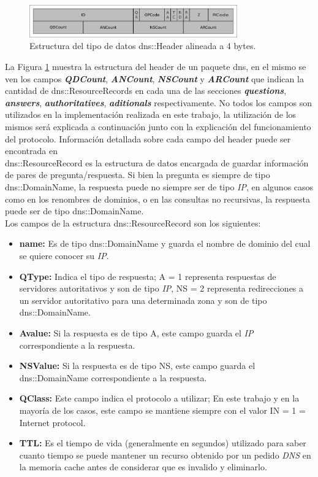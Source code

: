 \documentclass[10pt,a4paper]{article}
\begin{document}
\begin{figure}[!htb]
    \centering
    \includegraphics[width = 0.8\textwidth]{img/png/dns-header.png}
    \caption{Estructura del tipo de datos dns::Header alineada a 4 bytes.}
    \label{figure: dns header}
\end{figure}

La Figura \ref{figure: dns header} muestra la estructura del header de un paquete dns, en el mismo se ven los campos \textbf{\textit{QDCount}}, \textbf{\textit{ANCount}}, \textbf{\textit{NSCount}} y \textbf{\textit{ARCount}} que indican la cantidad de dns::ResourceRecords en cada una de las secciones \textbf{\textit{questions}}, \textbf{\textit{answers}}, \textbf{\textit{authoritatives}}, \textbf{\textit{aditionals}} respectivamente. No todos los campos son utilizados en la implementación realizada en este trabajo, la utilización de los mismos será explicada a continuación junto con la explicación del funcionamiento del protocolo. Información detallada sobre cada campo del header puede ser encontrada en \cite{dnsheader}\\

dns::ResourceRecord es la estructura de datos encargada de guardar información de pares de pregunta/respuesta. Si bien la pregunta es siempre de tipo dns::DomainName, la respuesta puede no siempre ser de tipo \textit{IP}, en algunos casos como en los renombres de dominios, o en las consultas no recursivas, la respuesta puede ser  de tipo dns::DomainName.\\

Los campos de la estructura dns::ResourceRecord son los siguientes:

\begin{itemize}
\item \textbf{name: } Es de tipo dns::DomainName y guarda el nombre de dominio del cual se quiere conocer su \textit{IP}.
\item \textbf{QType: } Indica el tipo de respuesta; A = 1 representa respuestas de servidores autoritativos y son de tipo \textit{IP}, NS = 2 representa redirecciones a un servidor autoritativo para una determinada zona y son de tipo dns::DomainName.
\item \textbf{Avalue: } Si la respuesta es de tipo A, este campo guarda el \textit{IP} correspondiente a la respuesta.
\item \textbf{NSValue: } Si la respuesta es de tipo NS, este campo guarda el dns::DomainName correspondiente a la respuesta.
\item \textbf{QClass: } Este campo indica el protocolo a utilizar; En este trabajo y en la mayoría de los casos, este campo se mantiene siempre con el valor IN = 1 = Internet protocol.
\item \textbf{TTL: } Es el tiempo de vida (generalmente en segundos) utilizado para saber cuanto tiempo se puede mantener un recurso obtenido por un pedido \textit{DNS} en la memoria cache antes de considerar que es invalido y eliminarlo.
\end{itemize}
\end{document}
